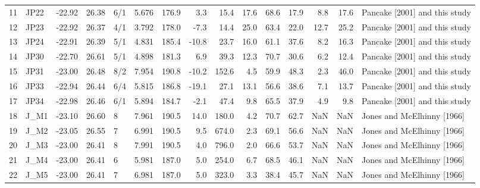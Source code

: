\documentclass{article}
\begin{document}
{\begin{tabular}{llrrlrrrrrrrrrl}
11 &              JP22 &        -22.92 &          26.38 &    6/1 &   5.676 &  176.9 &   3.3 &   15.4 &  17.6 &  68.6 &   17.9 &   8.8 &  17.6 &  Pancake [2001] and this study \\
12 &              JP23 &        -22.92 &          26.37 &    4/1 &   3.792 &  178.0 &  -7.3 &   14.4 &  25.0 &  63.4 &   22.0 &  12.7 &  25.2 &  Pancake [2001] and this study \\
13 &              JP24 &        -22.91 &          26.39 &    5/1 &   4.831 &  185.4 & -10.8 &   23.7 &  16.0 &  61.1 &   37.6 &   8.2 &  16.3 &  Pancake [2001] and this study \\
14 &              JP30 &        -22.70 &          26.61 &    5/1 &   4.898 &  181.3 &   6.9 &   39.3 &  12.3 &  70.7 &   30.6 &   6.2 &  12.4 &  Pancake [2001] and this study \\
15 &              JP31 &        -23.00 &          26.48 &    8/2 &   7.954 &  190.8 & -10.2 &  152.6 &   4.5 &  59.9 &   48.3 &   2.3 &  46.0 &  Pancake [2001] and this study \\
16 &              JP33 &        -22.94 &          26.44 &    6/4 &   5.815 &  186.8 & -19.1 &   27.1 &  13.1 &  56.6 &   38.6 &   7.1 &  13.7 &  Pancake [2001] and this study \\
17 &              JP34 &        -22.98 &          26.46 &    6/1 &   5.894 &  184.7 &  -2.1 &   47.4 &   9.8 &  65.5 &   37.9 &   4.9 &   9.8 &  Pancake [2001] and this study \\
18 &              J\_M1 &        -23.10 &          26.60 &      8 &   7.961 &  190.5 &  14.0 &  180.0 &   4.2 &  70.7 &   62.7 &   NaN &   NaN &     Jones and McElhinny [1966] \\
19 &              J\_M2 &        -23.05 &          26.55 &      7 &   6.991 &  190.5 &   9.5 &  674.0 &   2.3 &  69.1 &   56.6 &   NaN &   NaN &     Jones and McElhinny [1966] \\
20 &              J\_M3 &        -23.00 &          26.41 &      8 &   7.991 &  190.5 &   4.0 &  796.0 &   2.0 &  66.6 &   53.7 &   NaN &   NaN &     Jones and McElhinny [1966] \\
21 &              J\_M4 &        -23.00 &          26.41 &      6 &   5.981 &  187.0 &   5.0 &  254.0 &   6.7 &  68.5 &   46.1 &   NaN &   NaN &     Jones and McElhinny [1966] \\
22 &              J\_M5 &        -23.00 &          26.41 &      7 &   6.981 &  187.0 &   5.0 &  323.0 &   3.3 &  38.4 &   45.7 &   NaN &   NaN &     Jones and McElhinny [1966] \\

\end{tabular}}
\end{document}
